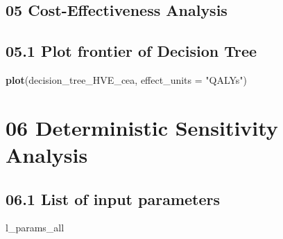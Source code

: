 \documentclass[
]{article}
\newenvironment{Shaded}{\begin{snugshade}}{\end{snugshade}}
\newcommand{\CommentTok}[1]{\textcolor[rgb]{0.56,0.35,0.01}{\textit{#1}}}
\newcommand{\DataTypeTok}[1]{\textcolor[rgb]{0.13,0.29,0.53}{#1}}
\newcommand{\KeywordTok}[1]{\textcolor[rgb]{0.13,0.29,0.53}{\textbf{#1}}}
\newcommand{\NormalTok}[1]{#1}
\newcommand{\OperatorTok}[1]{\textcolor[rgb]{0.81,0.36,0.00}{\textbf{#1}}}
\newcommand{\StringTok}[1]{\textcolor[rgb]{0.31,0.60,0.02}{#1}}
\begin{document}
\hypertarget{cost-effectiveness-analysis}{%
\subsection{05 Cost-Effectiveness
Analysis}\label{cost-effectiveness-analysis}}

\begin{Shaded}
\end{Shaded}

\hypertarget{plot-frontier-of-decision-tree}{%
\subsection{05.1 Plot frontier of Decision
Tree}\label{plot-frontier-of-decision-tree}}

\begin{Shaded}
\begin{Highlighting}[]
\KeywordTok{plot}\NormalTok{(decision_tree_HVE_cea, }\DataTypeTok{effect_units =} \StringTok{"QALYs"}\NormalTok{)}
\end{Highlighting}
\end{Shaded}

\hypertarget{deterministic-sensitivity-analysis}{%
\section{06 Deterministic Sensitivity
Analysis}\label{deterministic-sensitivity-analysis}}

\hypertarget{list-of-input-parameters}{%
\subsection{06.1 List of input
parameters}\label{list-of-input-parameters}}

\begin{Shaded}
\begin{Highlighting}[]
\NormalTok{l_params_all }
\end{Highlighting}
\end{Shaded}
\end{document}
